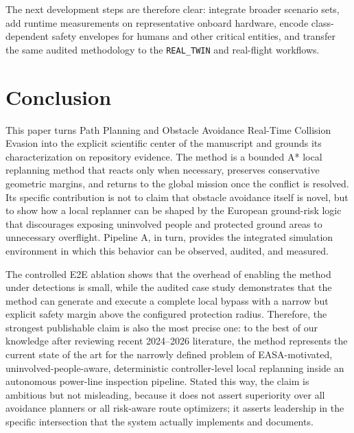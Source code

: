 \documentclass[a4paper,11pt]{article}
\begin{document}
The next development steps are therefore clear: integrate broader scenario sets, add runtime measurements on representative onboard hardware, encode class-dependent safety envelopes for humans and other critical entities, and transfer the same audited methodology to the \texttt{REAL\_TWIN} and real-flight workflows.


\section{Conclusion}

This paper turns Path Planning and Obstacle Avoidance Real-Time Collision Evasion into the explicit scientific center of the manuscript and grounds its characterization on repository evidence. The method is a bounded A* local replanning method that reacts only when necessary, preserves conservative geometric margins, and returns to the global mission once the conflict is resolved. Its specific contribution is not to claim that obstacle avoidance itself is novel, but to show how a local replanner can be shaped by the European ground-risk logic that discourages exposing uninvolved people and protected ground areas to unnecessary overflight. Pipeline A, in turn, provides the integrated simulation environment in which this behavior can be observed, audited, and measured.

The controlled E2E ablation shows that the overhead of enabling the method under detections is small, while the audited case study demonstrates that the method can generate and execute a complete local bypass with a narrow but explicit safety margin above the configured protection radius. Therefore, the strongest publishable claim is also the most precise one: to the best of our knowledge after reviewing recent 2024--2026 literature, the method represents the current state of the art for the narrowly defined problem of EASA-motivated, uninvolved-people-aware, deterministic controller-level local replanning inside an autonomous power-line inspection pipeline. Stated this way, the claim is ambitious but not misleading, because it does not assert superiority over all avoidance planners or all risk-aware route optimizers; it asserts leadership in the specific intersection that the system actually implements and documents.



\end{document}
